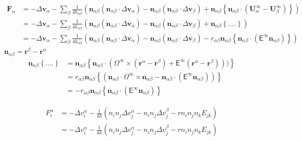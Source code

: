 \documentclass[11pt]{scrartcl}
\newcommand{\tens}[1]{\bm{\mathsf{#1}}}
\begin{document}
\begin{align*}
  \bm{F}_\alpha  &= 
  -  \Delta \bm{v}_\alpha
  - \sum_{\beta}
  \frac{1}{4h_{\alpha\beta}}
  \left(
    \bm{n}_{\alpha\beta} (\bm{n}_{\alpha\beta}\cdot \Delta \bm{v}_{\alpha})
    - 
    \bm{n}_{\alpha\beta} (\bm{n}_{\alpha\beta}\cdot \Delta \bm{v}_\beta )
    +
    \bm{n}_{\alpha\beta}
    \left\{
      \bm{n}_{\alpha\beta}  \cdot
      (\bm{U}_{\alpha}^{\infty}-\bm{U}_{\beta}^{\infty})
    \right\}
  \right)  \\
&=  -  \Delta \bm{v}_\alpha 
 - \sum_{\beta}
  \frac{1}{4h_{\alpha\beta}}
  \left(
    \bm{n}_{\alpha\beta} (\bm{n}_{\alpha\beta}\cdot \Delta \bm{v}_{\alpha})
    - 
    \bm{n}_{\alpha\beta} (\bm{n}_{\alpha\beta}\cdot \Delta \bm{v}_\beta )
    +
    \bm{n}_{\alpha\beta}
    \left\{
  ....
    \right\}
  \right) \\
&=  -  \Delta \bm{v}_\alpha 
 - \sum_{\beta}
  \frac{1}{4h_{\alpha\beta}}
  \left(
    \bm{n}_{\alpha\beta} (\bm{n}_{\alpha\beta}\cdot \Delta \bm{v}_{\alpha})
    - 
    \bm{n}_{\alpha\beta} (\bm{n}_{\alpha\beta}\cdot \Delta \bm{v}_\beta )
    -
r_{\alpha\beta}
  \bm{n}_{\alpha\beta}
  \left\{
\bm{n}_{\alpha\beta} \cdot
(\tens{E}^{\infty} \bm{n}_{\alpha\beta})
    \right\} 
  \right) 
\end{align*}
$\bm{n}_{\alpha\beta} = \bm{r}^{\beta}-\bm{r}^{\alpha}$
\begin{align*}
    \bm{n}_{\alpha\beta}    \left\{
  ....
    \right\} &= 
  \bm{n}_{\alpha\beta}
  \left\{
    \bm{n}_{\alpha\beta}  \cdot
      (
\Omega^{\infty} \times (\bm{r}^{\alpha}-\bm{r}^{\beta})
+ 
\tens{E}^{\infty}
(\bm{r}^{\alpha}-\bm{r}^{\beta}))
)
    \right\} \\
&= 
r_{\alpha\beta}
  \bm{n}_{\alpha\beta}
  \left\{
      (
\bm{n}_{\alpha\beta} \cdot \Omega^{\infty} \times \bm{n}_{\alpha\beta}
- 
\bm{n}_{\alpha\beta} \cdot
(\tens{E}^{\infty} \bm{n}_{\alpha\beta})
)
    \right\} \\
&= 
-r_{\alpha\beta}
  \bm{n}_{\alpha\beta}
  \left\{
\bm{n}_{\alpha\beta} \cdot
(\tens{E}^{\infty} \bm{n}_{\alpha\beta})
    \right\} 
\end{align*}

\begin{align*}
 F^{\alpha}_i
&=
- \Delta v^{\alpha}_i
- \frac{1}{4 h}
\left(
n_{i} n_j \Delta v^{\alpha}_j
- n_{i} n_j \Delta v^{\beta}_j
- r n_i n_j n_k E_{jk}
\right) \\
&=
- \Delta v^{\alpha}_i
- \frac{1}{4 h}
\left(
n_{i} n_j \Delta v^{\alpha}_j
- n_{i} n_j \Delta v^{\beta}_j
- r n_i n_j n_k E_{jk}
\right) 
\end{align*}
\end{document}
